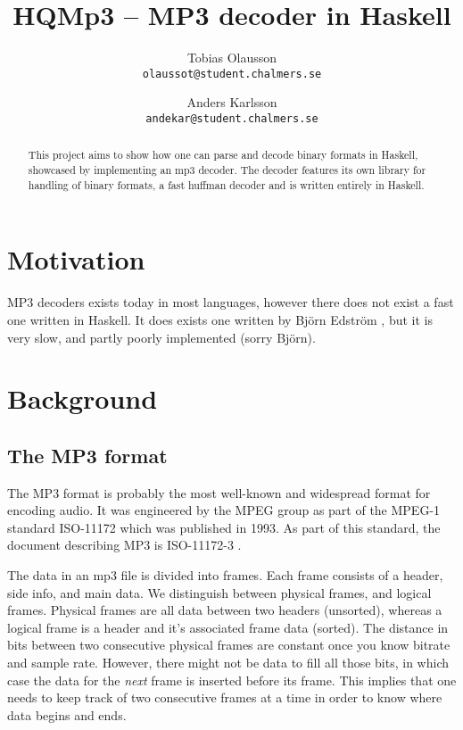 \documentclass[a4paper,12pt]{article}
\title{HQMp3 -- MP3 decoder in Haskell}
\author{Tobias Olausson \\ \texttt{\small{olaussot@student.chalmers.se}} \and
        Anders Karlsson \\ \texttt{\small{andekar@student.chalmers.se}}
}
\date{ \rule{0.8 \linewidth}{0.5mm} \\[3mm]
       University of Gothenburg \\
       \small{\today}
}
\begin{document}
\maketitle

\begin{abstract}
    This project aims to show how one can parse and decode binary formats in
    Haskell, showcased by implementing an mp3 decoder. The decoder features its
    own library for handling of binary formats, a fast huffman decoder and is
    written entirely in Haskell.
\end{abstract}

\tableofcontents

\section{Motivation}
    MP3 decoders exists today in most languages, however there does not exist
    a fast one written in Haskell. It does exists one written by Björn Edström
    \cite{bjorn}, but it is very slow, and partly poorly implemented (sorry
    Björn).

\section{Background}
    \subsection{The MP3 format}
       The MP3 format is probably the most well-known and widespread format for
       encoding audio. It was engineered by the MPEG group as part of the MPEG-1
       standard ISO-11172 which was published in 1993. As part of this standard,
       the document describing MP3 is ISO-11172-3 \cite{wikimp3,wikimpeg1}.

       The data in an mp3 file is divided into frames. Each frame consists of
       a header, side info, and main data. We distinguish between physical
       frames, and logical frames. Physical frames are all data between two
       headers (unsorted), whereas a logical frame is a header and it's
       associated frame data (sorted). The distance in bits between two
       consecutive physical frames are constant once you know bitrate and sample
       rate. However, there might not be data to fill all those bits, in which
       case the data for the \textit{next} frame is inserted before its frame.
       This implies that one needs to keep track of two consecutive frames at a
       time in order to know where data begins and ends.
\end{document}
